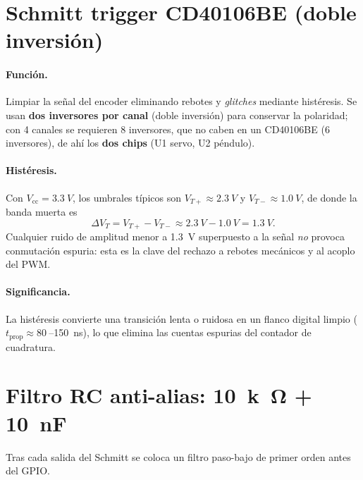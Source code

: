\documentclass[11pt,letterpaper]{article}
\begin{document}
\section{Schmitt trigger CD40106BE (doble inversión)}
\paragraph{Función.} Limpiar la señal del encoder eliminando rebotes y \emph{glitches}
mediante histéresis. Se usan \textbf{dos inversores por canal} (doble inversión)
para conservar la polaridad; con 4 canales se requieren 8 inversores, que no caben
en un CD40106BE (6 inversores), de ahí los \textbf{dos chips} (U1 servo, U2 péndulo).

\paragraph{Histéresis.} Con $V_\text{cc}=\SI{3.3}{V}$, los umbrales típicos son
$V_{T+}\approx\SI{2.3}{V}$ y $V_{T-}\approx\SI{1.0}{V}$, de donde la banda muerta es
\begin{equation}
  \Delta V_T = V_{T+}-V_{T-} \approx \SI{2.3}{V}-\SI{1.0}{V} = \SI{1.3}{V}.
\end{equation}
Cualquier ruido de amplitud menor a \SI{1.3}{V} superpuesto a la señal \emph{no}
provoca conmutación espuria: esta es la clave del rechazo a rebotes mecánicos y al
acoplo del PWM.

\paragraph{Significancia.} La histéresis convierte una transición lenta o ruidosa
en un flanco digital limpio ($t_\text{prop}\approx\SI{80}{}$--\SI{150}{ns}), lo que
elimina las cuentas espurias del contador de cuadratura.

\section{Filtro RC anti-alias: \texorpdfstring{\SI{10}{k\ohm}}{10 kOhm} + \texorpdfstring{\SI{10}{nF}}{10 nF}}
\label{sec:rc}
Tras cada salida del Schmitt se coloca un filtro paso-bajo de primer orden antes
del GPIO.
\end{document}
